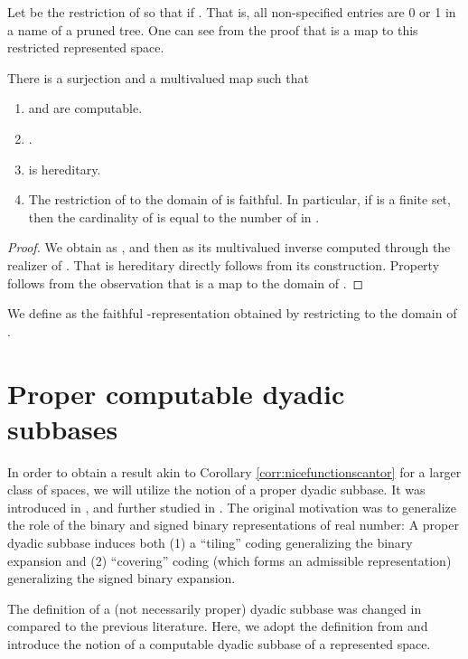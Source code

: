 \documentclass{eptcs-modified}
\begin{document}
Let  be the restriction of  so that
 if .  That is,
all non-specified entries are 0 or 1 in a name of a pruned tree.
One can see from the proof that  is a map to this restricted represented space.

\begin{corollary}
\label{corr:nicefunctionscantor}
There is a surjection  and a multivalued
map  such that
\begin{enumerate}
\item  and  are computable.
\item .
\item  is hereditary.
\item The restriction of  to the domain of  is faithful. In particular, if  is a finite set, then
the cardinality of  is equal to the number of  in .
\end{enumerate}
\begin{proof}
We obtain  as , and then  as its multivalued inverse
computed through the realizer of .
That  is hereditary directly follows from its construction.
Property  follows from the observation that   is a map to
the domain of .
\end{proof}
\end{corollary}

We define  as the faithful -representation
obtained by restricting   to the domain of .


\section{Proper computable dyadic subbases}
\label{sec:propersubbases}

In order to obtain a result akin to  Corollary \ref{corr:nicefunctionscantor} for a larger class of spaces, we will utilize the notion of a proper dyadic subbase.  It was introduced in \cite{tsuiki},
and further studied in \cite{tsuiki2,tsuiki4,TsukamotoTsuiki:2016,tsukamotophd}.
The original motivation was to generalize the role of the binary and signed binary representations of real number: A proper dyadic subbase induces both (1) a ``tiling'' coding generalizing the binary expansion and (2) ``covering'' coding (which forms an admissible representation) generalizing the signed binary expansion.

The definition of a (not necessarily proper) dyadic subbase was changed in \cite{TsukamotoTsuiki:2016} compared to the previous literature.  Here, we adopt the definition from \cite{TsukamotoTsuiki:2016} and introduce the notion of a computable dyadic subbase of a represented space.
\end{document}
